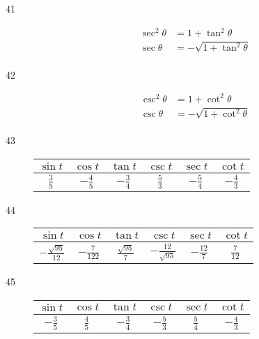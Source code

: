 \documentclass{exam}
\begin{document}
\begin{description}
      \item[41]
        \begin{align*}
          \sec^2 \theta & = 1 + \tan^2 \theta \\
          \sec \theta   & = \boxed{ - \sqrt{ 1 + \tan^2 \theta } } \\
        \end{align*}

      \item[42]
        \begin{align*}
          \csc^2 \theta & = 1 + \cot^2 \theta \\
          \csc \theta   & = \boxed{ - \sqrt{ 1 + \cot^2 \theta } } \\
        \end{align*}

      \item[43]
        \begin{tabular}[H]{cccccc}
          \toprule
          $\sin t$      & $\cos t$        & $\tan t$        & $\csc t$      & $\sec t$        & $\cot t$ \\
          \midrule
          $\frac{3}{5}$ & $- \frac{4}{5}$ & $- \frac{3}{4}$ & $\frac{5}{3}$ & $- \frac{5}{4}$ & $- \frac{4}{3}$ \\
          \bottomrule
        \end{tabular}

      \item[44]
        \begin{tabular}[H]{cccccc}
          \toprule
          $\sin t$                & $\cos t$         & $\tan t$              & $\csc t$                & $\sec t$        & $\cot t$ \\
          \midrule
          $-\frac{\sqrt{95}}{12}$ & $-\frac{7}{122}$ & $\frac{\sqrt{95}}{7}$ & $-\frac{12}{\sqrt{95}}$ & $-\frac{12}{7}$ & $\frac{7}{12}$ \\
          \bottomrule
        \end{tabular}

      \item[45]
        \begin{tabular}[H]{cccccc}
          \toprule
          $\sin t$       & $\cos t$      & $\tan t$       & $\csc t$       & $\sec t$      & $\cot t$ \\
          \midrule
          $-\frac{3}{5}$ & $\frac{4}{5}$ & $-\frac{3}{4}$ & $-\frac{5}{3}$ & $\frac{5}{4}$ & $-\frac{4}{3}$ \\
          \bottomrule
        \end{tabular}


\end{description}
\end{document}
